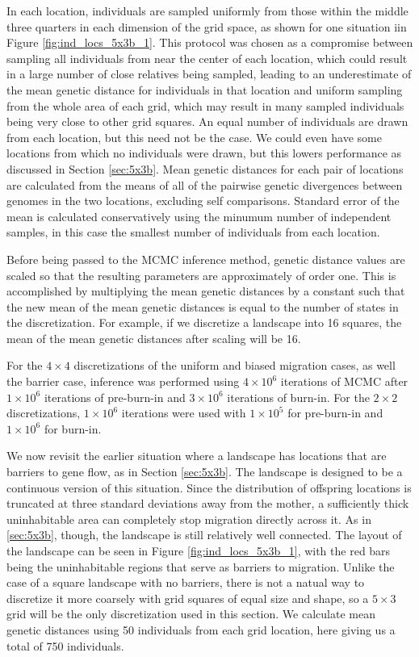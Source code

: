 \documentclass{article}
\begin{document}
In each location, individuals are sampled uniformly from those 
within the middle three quarters in each dimension of the grid space,
as shown for one situation iin Figure \ref{fig:ind_locs_5x3b_1}.
This protocol was chosen as a compromise between sampling all individuals 
from near the center of each location,
which could result in a large number of close relatives being sampled, 
leading to an underestimate of the mean genetic distance for individuals in that location
and uniform sampling from the whole area of each grid, 
which may result in many sampled individuals being very close to other grid squares.
An equal number of individuals are drawn from each location,
but this need not be the case.
We could even have some locations from which no individuals were drawn,
but this lowers performance as discussed in Section \ref{sec:5x3b}.
Mean genetic distances for each pair of locations 
are calculated from the means of all of the pairwise genetic divergences 
between genomes in the two locations, excluding self comparisons.
Standard error of the mean is calculated conservatively using 
the minumum number of independent samples, 
in this case the smallest number of individuals from each location.

Before being passed to the MCMC inference method,
genetic distance values are scaled so that the resulting parameters 
are approximately of order one.
This is accomplished by multiplying the mean genetic distances by a constant
such that the new mean of the mean genetic distances 
is equal to the number of states in the discretization. 
For example, if we discretize a landscape into 16 squares, 
the mean of the mean genetic distances after scaling will be 16.

For the $4 \times 4$ discretizations of the uniform and biased migration cases, 
as well the barrier case, 
inference was performed using $4 \times 10^6$ iterations of MCMC
after $1 \times 10^6$ iterations of pre-burn-in and $3 \times 10^6$ iterations of burn-in. 
For the $2 \times 2$ discretizations, $1 \times 10^6$ iterations were used 
with $1 \times 10^5$ for pre-burn-in and $1 \times 10^6$ for burn-in.


We now revisit the earlier situation where a landscape has locations that are barriers to gene flow,
as in Section \ref{sec:5x3b}.
The landscape is designed to be a continuous version of this situation.
Since the distribution of offspring locations is truncated at three standard deviations
away from the mother, a sufficiently thick uninhabitable area can completely stop migration
directly across it.
As in \ref{sec:5x3b}, though, the landscape is still relatively well connected.
The layout of the landscape can be seen in Figure \ref{fig:ind_locs_5x3b_1},
with the red bars being the uninhabitable regions that serve as barriers to migration.
Unlike the case of a square landscape with no barriers, 
there is not a natual way to discretize it more coarsely 
with grid squares of equal size and shape,
so a $5 \times 3$ grid will be the only discretization used in this section.
We calculate mean genetic distances using 50 individuals 
from each grid location,
here giving us a total of 750 individuals.
\end{document}
